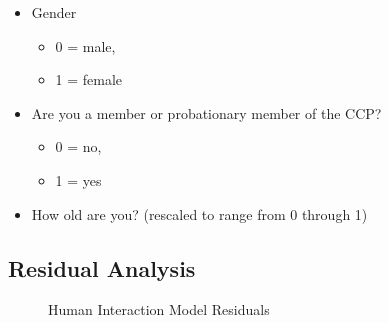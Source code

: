 \documentclass[]{interact}
\theoremstyle{plain}%
\theoremstyle{definition}
\theoremstyle{remark}
\begin{document}
\begin{itemize}
\item
  Gender

  \begin{itemize}
  \item
    0 = male,
  \item
    1 = female
  \end{itemize}
\item
  Are you a member or probationary member of the CCP?

  \begin{itemize}
  \item
    0 = no,
  \item
    1 = yes
  \end{itemize}
\item
  How old are you? (rescaled to range from 0 through 1)
\end{itemize}

\newpage{}

\subsection{Residual Analysis}\label{residual-analysis}

\begin{figure}


\caption{\label{fig-resids-human}Human Interaction Model Residuals}

\end{figure}%
\end{document}
